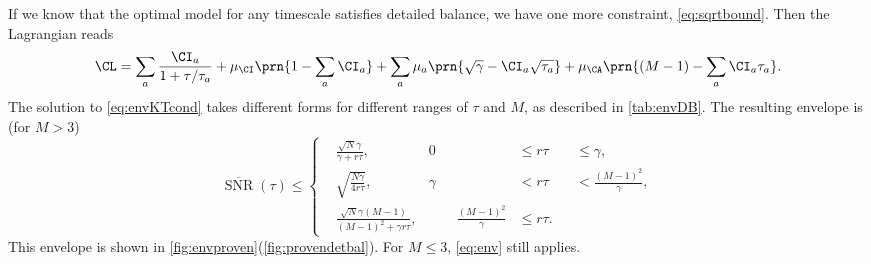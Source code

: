 \documentclass[12pt]{article}
\newcommand{\kktm}{\mu}
\DeclareMathOperator{\snr}{SNR}
\newcommand{\snrb}{\overline{\snr}}
\newcommand{\cnst}{\gamma}
\begin{document}
If we know that the optimal model for any timescale satisfies detailed balance, we have one more constraint, \cref{eq:sqrtbound}.
Then the Lagrangian reads
%
\begin{equation}\label{eq:envDBlagrangian}
  \CL = \sum_a \frac{\CI_a}{1+\tau/\tau_a} + \kktm_\CI \prn{1 - \sum_a \CI_a} 
      + \sum_a \kktm_a \prn{\sqrt{\cnst} - \CI_a \sqrt{\tau_a}} + \kktm_\CA \prn{(M-1) - \sum_a \CI_a \tau_a}.
\end{equation}
%
The solution to \cref{eq:envKTcond} takes different forms for different ranges of \(\tau\) and \(M\),
as described in \cref{tab:envDB}.
The resulting envelope is (for \(M > 3\))
%
\begin{equation}\label{eq:envDB}
  \snrb(\tau) \leq 
  \left\{ 
  \begin{alignedat}{3}
    &\frac{\sqrt{N} \cnst}{\cnst + r \tau}
      , &
      0 &\leq r \tau &&\leq \cnst
      , \\
    &\sqrt{\frac{N\cnst}{4 r \tau}}
      , &
      \cnst &< r \tau &&< \frac{(M-1)^2}{\cnst}
      , \\
    &\frac{\sqrt{N} \cnst (M-1)}{(M-1)^2 + \cnst r \tau}
      , &\qquad
      \frac{(M-1)^2}{\cnst} &\leq r \tau 
      .
  \end{alignedat}
  \right.
\end{equation}
%
This envelope is shown in \cref{fig:envproven}(\ref{fig:provendetbal}).
For \(M \leq 3\), \cref{eq:env} still applies.
\end{document}
